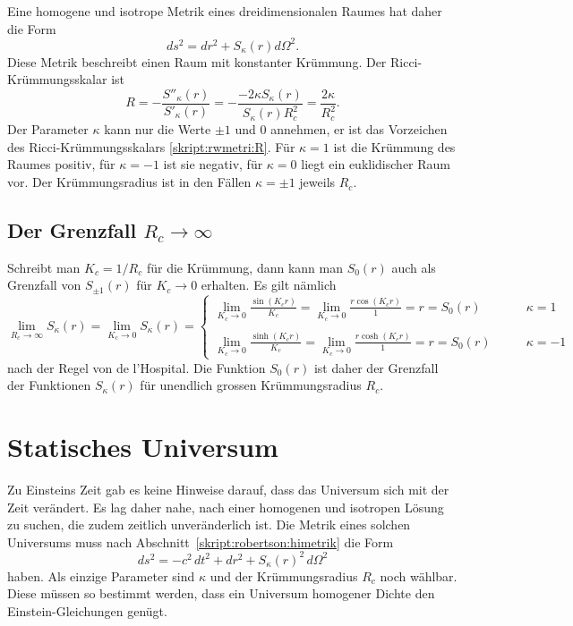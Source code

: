Eine homogene und isotrope Metrik eines dreidimensionalen Raumes
hat daher die Form
\begin{equation}
ds^2=dr^2 + S_{\kappa}(r)d\Omega^2.
\label{skript:rwmetrik:metrikS}
\end{equation}
Diese Metrik beschreibt einen Raum mit konstanter Krümmung.
Der Ricci-Krümmungsskalar ist
\begin{equation}
R
=
-\frac{S''_\kappa(r)}{S'_\kappa(r)}
=
-\frac{-2\kappa S_\kappa(r)}{S_\kappa(r)R_c^2}
=
\frac{2\kappa}{R_c^2}.
\label{skript:rwmetrik:R}
\end{equation}
Der Parameter $\kappa$ kann nur die Werte $\pm 1$ und $0$ annehmen, er ist
das Vorzeichen des Ricci-Krümmungsskalars \eqref{skript:rwmetri:R}.
Für $\kappa=1$ ist die Krümmung des Raumes positiv, für $\kappa=-1$ ist
sie negativ, für $\kappa=0$ liegt ein euklidischer Raum vor.
Der Krümmungsradius ist in den Fällen $\kappa=\pm1$ jeweils $R_c$.

\subsection{Der Grenzfall $R_c\to\infty$}
Schreibt man $K_c = 1/R_c$ für die Krümmung, dann kann man $S_0(r)$
auch als Grenzfall von $S_{\pm 1}(r)$ für $K_c\to 0$ erhalten.
Es gilt  nämlich
\begin{equation}
\lim_{R_c\to\infty} S_\kappa(r)
=
\lim_{K_c\to 0} S_\kappa(r)
=\begin{cases}
\displaystyle
\lim_{K_c\to 0}\frac{\displaystyle \sin(K_cr)}{\displaystyle K_c}
=
\lim_{K_c\to 0}\frac{\displaystyle r\cos(K_cr)}{\displaystyle 1} = r = S_0(r)
&\qquad\kappa=1
\\
\\
\displaystyle
\lim_{K_c\to 0}\frac{\displaystyle \sinh(K_cr)}{\displaystyle K_c}
=
\lim_{K_c\to 0}\frac{\displaystyle r\cosh(K_cr)}{\displaystyle 1} = r = S_0(r)
&\qquad\kappa=-1
\end{cases}
\end{equation}
nach der Regel von de l'Hospital.
Die Funktion $S_0(r)$ ist daher der Grenzfall der Funktionen
$S_\kappa(r)$ für unendlich grossen Krümmungsradius $R_c$.

\section{Statisches Universum}
Zu Einsteins Zeit gab es keine Hinweise darauf, dass das Universum
sich mit der Zeit verändert.
Es lag daher nahe, nach einer homogenen und isotropen Lösung zu suchen,
die zudem zeitlich unveränderlich ist.
Die Metrik eines solchen Universums muss nach
Abschnitt~\ref{skript:robertson:himetrik}
die Form
\[
ds^2
=
-c^2\,dt^2 + dr^2 + S_\kappa(r)^2\,d\Omega^2
\]
haben.
Als einzige Parameter sind $\kappa$ und der Krümmungsradius $R_c$ 
noch wählbar. 
Diese müssen so bestimmt werden, dass ein Universum homogener Dichte
den Einstein-Gleichungen genügt.

